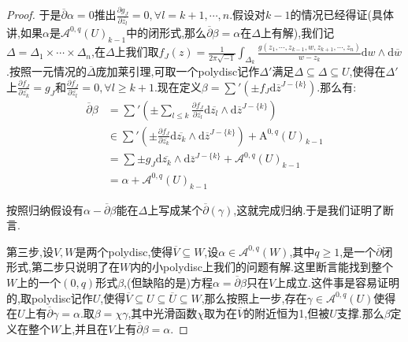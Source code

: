 \begin{enumerate}
\begin{proof}
		于是$\overline{\partial}\alpha=0$推出$\frac{\partial g_J}{\partial\overline{z_l}}=0,\forall l=k+1,\cdots,n$.假设对$k-1$的情况已经得证(具体讲,如果$\alpha$是$\mathscr{A}^{0,q}(U)_{k-1}$中的闭形式,那么$\overline{\partial}\beta=\alpha$在$\Delta$上有解),我们记$\Delta=\Delta_1\times\cdots\times\Delta_n$,在$\Delta$上我们取$f_J(z)=\frac{1}{2\pi\sqrt{-1}}\int_{\Delta_k}\frac{g(z_1,\cdots,z_{k-1},w,z_{k+1},\cdots,z_n)}{w-z_k}\mathrm{d}w\wedge\mathrm{d}\overline{w}$.按照一元情况的$\overline{\Delta}$庞加莱引理,可取一个polydisc记作$\Delta'$满足$\Delta\subseteq\Delta\subseteq U$,使得在$\Delta'$上$\frac{\partial f_J}{\partial\overline{z_k}}=g_J$和$\frac{\partial f_J}{\partial\overline{z_l}}=0,\forall l\ge k+1$.现在定义$\beta=\sum'(\pm f_J\mathrm{d}\overline{z}^{J-\{k\}})$.那么有:
		\begin{align*}
			\overline{\partial}\beta&=\sum'(\pm\sum_{l\le k}\frac{\partial f_J}{\partial\overline{z_l}}\mathrm{d}\overline{z_l}\wedge\mathrm{d}\overline{z}^{J-\{k\}})\\&\in\sum'(\pm\frac{\partial f_J}{\partial\overline{z_k}}\mathrm{d}\overline{z_k}\wedge\mathrm{d}\overline{z}^{J-\{k\}})+\mathrm{A}^{0,q}(U)_{k-1}\\&=\sum\pm g_J\mathrm{d}\overline{z_k}\wedge\mathrm{d}\overline{z}^{J-\{k\}}+\mathscr{A}^{0,q}(U)_{k-1}\\&=\alpha+\mathscr{A}^{0,q}(U)_{k-1}
		\end{align*}
		
		按照归纳假设有$\alpha-\overline{\partial}\beta$能在$\Delta$上写成某个$\overline{\partial}(\gamma)$,这就完成归纳.于是我们证明了断言.
		
		\qquad
		
		第三步,设$V,W$是两个polydisc,使得$\overline{V}\subseteq W$,设$\alpha\in\mathscr{A}^{0,q}(W)$,其中$q\ge1$,是一个$\overline{\partial}$闭形式,第二步只说明了在$W$内的小polydisc上我们的问题有解.这里断言能找到整个$W$上的一个$(0,q)$形式$\beta$,(但缺陷的是)方程$\alpha=\overline{\partial}\beta$只在$V$上成立.这件事是容易证明的,取polydisc记作$U$,使得$\overline{V}\subseteq U\subseteq\overline{U}\subseteq W$,那么按照上一步,存在$\gamma\in\mathscr{A}^{0,q}(U)$使得在$U$上有$\overline{\partial}\gamma=\alpha$.取$\beta=\chi\gamma$,其中光滑函数$\chi$取为在$\overline{V}$的附近恒为1,但被$U$支撑.那么$\beta$定义在整个$W$上,并且在$V$上有$\overline{\partial}\beta=\alpha$.
		
		\qquad
		

\end{proof}
\end{enumerate}
